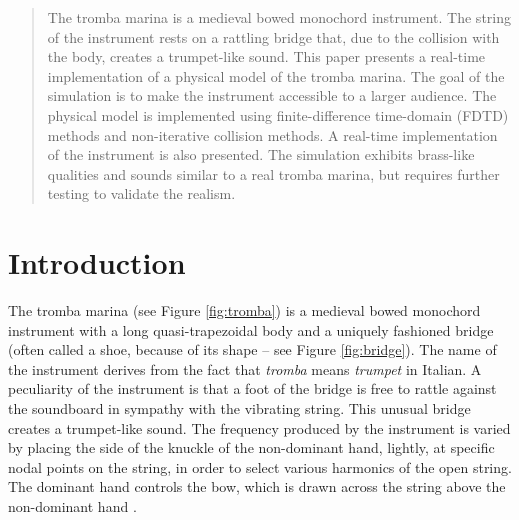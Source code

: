 \begin{abstract}
    The tromba marina is a medieval bowed monochord instrument. The string of the instrument rests on a rattling bridge that, due to the collision with the body, creates a trumpet-like sound. This paper presents a real-time implementation of a physical model of the tromba marina. The goal of the simulation is to make the instrument accessible to a larger audience. The physical model is implemented using finite-difference time-domain (FDTD) methods and non-iterative collision methods. A real-time implementation of the instrument is also presented. The simulation exhibits brass-like qualities and sounds similar to a real tromba marina, but requires further testing to validate the realism.
    \end{abstract}
    
    \section{Introduction}\label{sec:introduction}
    The tromba marina (see Figure 
     \ref{fig:tromba}) is a medieval bowed monochord instrument with a long quasi-trapezoidal body and a uniquely fashioned bridge (often called a shoe, because of its shape – see Figure \ref{fig:bridge}). 
     The name of the instrument derives from the fact that {\em tromba} means {\em trumpet} in Italian. A peculiarity of the instrument is that 
     a foot of the bridge is free to rattle against the soundboard in sympathy with the vibrating string. 
     This unusual bridge creates a trumpet-like sound.
     The frequency produced by the instrument is varied by placing the side of the knuckle of the non-dominant hand, lightly, at specific nodal points on the string, in order to select various harmonics of the open string. The dominant hand controls the bow, which is drawn across the string above the non-dominant hand \cite{munrow1976instruments}.
     
